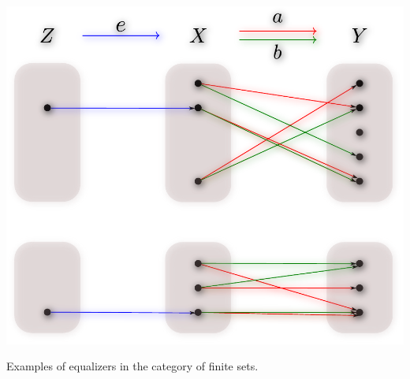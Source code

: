 \begin{frame}
\centering\includegraphics[width=0.8\framewidth]{fig/equalizer.pdf}

\begin{block}{}
\centering Examples of equalizers in the category of finite sets.
\end{block}
\end{frame}
